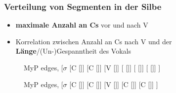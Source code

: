 \begin{frame}
\frametitle{Verteilung von Segmenten in der Silbe}


\begin{minipage}{.59\textwidth}
	\begin{itemize}
	\item \textbf{maximale Anzahl an Cs} vor und nach V
	
	
	\item Korrelation zwischen Anzahl an Cs nach V und der \textbf{Länge}/(Un-)Gespanntheit des Vokals
	\end{itemize}
\end{minipage}
%
\begin{minipage}{.4\textwidth}

\begin{figure}
	\small
	\centering
	\begin{forest}
	MyP edges,
	[$\sigma$
	[C []]
	[C []]
	[V []]	
	[ []]
	[ []]
	[ []]
	]
	\end{forest}
	
	\begin{forest}
	MyP edges,
	[$\sigma$
	[C []]
	[C [\textipa{\textscr }]]
	[V []]
	[C []]
	[C []]	
	]
	\end{forest}

\end{figure}

\end{minipage}


\end{frame}



